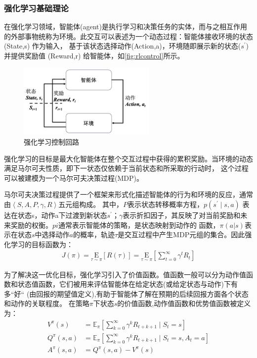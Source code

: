 \subsubsection{强化学习基础理论}
在强化学习领域，智能体(agent)是执行学习和决策任务的实体，而与之相互作用的外部事物统称为环境。此交互可以表述为一个动态过程：智能体接收环境的状态(State,s) 作为输入，
基于该状态选择动作(Action,a)，环境随即展示新的状态($s^{'}$)并提供奖励值 (Reward,r) 给智能体，如\autoref{fig:rlcontrol}所示。
\begin{figure}[H]
    \centering
    \includegraphics[width=0.6\textwidth]{figure/chapter1/强化学习.png}
    \caption{\label{fig:rlcontrol}强化学习控制回路}
\end{figure}

强化学习的目标是最大化智能体在整个交互过程中获得的累积奖励。当环境的动态满足马尔可夫性质，即下一状态仅依赖于当前状态和所采取的行动时，
这个过程可以被建模为一个马尔可夫决策过程(MDP)。

马尔可夫决策过程提供了一个框架来形式化描述智能体的行为和环境的反应，通常由$\left \langle S,A,P,\gamma,R \right \rangle$五元组构成。
其中，$P$表示状态转移概率方程，$p\left(s^{\prime} \mid s, a\right)$
表达在状态s，动作a下过渡到新状态$s^{'}$；$\gamma$表示折扣因子，其反映了对当前奖励和未来奖励的权衡。$pi$通常表示智能体的策略，是状态映射到动作的
函数，$\pi(a|s)$表示在状态$s$中选择动作$a$的概率，轨迹$\tau$是交互过程中产生MDP元组的集合。因此强化学习的目标函数为：
\begin{align}
        J(\pi)=\underset{\tau \sim \pi }{\mathrm{E}}\left [ R(\tau) \right ]=\underset{\tau \sim \pi }{\mathrm{E}}\left[\sum_{t=0}^{\infty} \gamma^{t} R_{t}\right]
\end{align}

为了解决这一优化目标，强化学习引入了价值函数。值函数一般可以分为动作值函数和状态值函数，它们被用来评估智能体在给定状态(或给定状态与动作)下有多“好“
(由回报的期望值定义),有助于智能体了解在预期的后续回报方面各个状态和动作的关联程度。
在策略$\pi$下状态$s$的价值函数,动作值函数和优势值函数被定义为：
\begin{align}
    V^{\pi}\left(s\right) & = \mathbb{E}_{\pi }\left[\sum_{k = 0}^{\infty} \gamma^{k} R_{t+k+1}\mid S_{t}= s\right]\\
    Q^{\pi}\left(s, a\right) &=\mathbb{E}_{\pi }\left[\sum_{k = 0}^{\infty} \gamma^{k} R_{t+k+1}\mid S_{t}= s,A_{t}=a\right]\\
    A^{\pi}(s, a)&=Q^{\pi}(s, a)-V^{\pi}(s)
\end{align}

